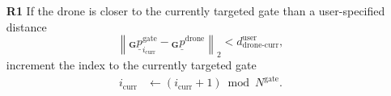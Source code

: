 \begin{itemize}
    \item [\textbf{R1}] If the drone is closer to the currently targeted gate
    than a user-specified distance
    \begin{equation}
        \left\| {}_\textbf{G} \underline p^\text{gate}_{i_\text{curr}} - {}_\textbf{G}\underline p^\text{drone} \right\|_2 
        < d^\text{user}_\text{drone-curr},
    \end{equation}
    increment the index to the currently targeted gate
    \begin{align}
        i_\text{curr} &\leftarrow (i_\text{curr} + 1) \bmod N^\text{gate}. 
    \end{align}
    

\end{itemize}
